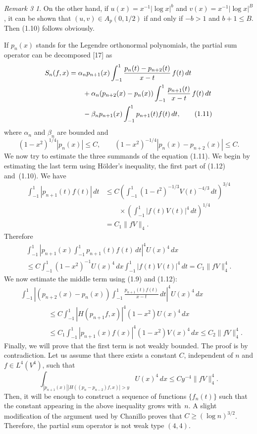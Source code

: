 \documentclass[10pt,a4paper]{article}
\theoremstyle{plain}
\theoremstyle{remark}
\newtheorem*{remThree}{Remark 3}
\begin{document}
\begin{remThree}
On the other hand, if $u(x) = x^{-1} |\log x|^{b}$
and $v(x) = x^{-1}|\log x|^{B}$, it can be shown
that $(u,v) \in A_{p}(0,1/2)$ if and only if $-b > 1$ and
$b+1 \leq B$. Then (1.10) follows obviously.

If $p_{n}(x)$ stands for the Legendre orthonormal polynomials, the
partial sum operator can be decomposed [17] as
\begin{align}
S_{n}(f,x) &= \alpha_{n}p_{n+1}(x)
\int_{-1}^{1} \frac{p_{n}(t)-p_{n+2}(t)}{x-t}\, f(t)\,dt \notag \\
&\qquad\null + \alpha_{n}(p_{n+2}(x)-p_{n}(x))
\int_{-1}^{1} \frac{p_{n+1}(t)}{x-t}\, f(t)\,dt \notag \\
&\qquad\null - \beta_{n}p_{n+1}(x) \int_{-1}^{1} p_{n+1}(t)f(t)\,dt,
\tag{1.11}
\end{align}
where $\alpha_{n}$ and $\beta_{n}$ are bounded and
\begin{equation}
(1-x^{2})^{1/4} |p_{n}(x)| \leq C,
\qquad (1-x^{2})^{-1/4} |p_{n}(x)-p_{n+2}(x)| \leq C.
\tag{1.12}
\end{equation}
We now try to estimate the three summands of the equation (1.11).
We begin by estimating the last term using H\"{o}lder's inequality,
the first part of (1.12) and~(1.10). We have
\begin{align*}
\int_{-1}^{1} |p_{n+1}(t)f(t)|\,dt
&\leq C \left( \int_{-1}^{1} (1-t^{2})^{-1/3} V(t)^{-4/3}\,dt \right)^{3/4} \\
&\qquad \times \left(\int_{-1}^{1} |f(t)V(t)|^{4}\,dt \right)^{1/4} \\
&= C_{1}\|fV\|_{4}.
\end{align*}
Therefore
\begin{multline*}
\int_{-1}^{1} \left| p_{n+1}(x)\int_{-1}^{1} p_{n+1}(t)f(t) \,dt
\right|^{4}U(x)^{4}\,dx \\
\leq C \int_{-1}^{1} (1-x^{2})^{-1}U(x)^{4}\,dx \int_{-1}^{1} |f(t)V(t)|^{4}\,dt
= C_{1}\|fV\|_{4}^{4}.
\end{multline*}
We now estimate the middle term using (1.9) and (1.12):
\begin{align*}
&\int_{-1}^{1} \left| (p_{n+2}(x)-p_{n}(x))
\int_{-1}^{1} \frac{p_{n+1}(t)f(t)}{x-t} \,dt \right|^{4}U(x)^{4}\,dx \\
&\qquad\qquad\leq C\int_{-1}^{1} |H(p_{n+1}f,x)|^{4}(1-x^{2})U(x)^{4}\,dx \\
&\qquad\qquad\leq C_{1}\int_{-1}^{1} |p_{n+1}(x)f(x)|^{4}(1-x^{2})V(x)^{4}\,dx
\leq C_{2}\|fV\|_{4}^{4}.
\end{align*}
Finally, we will prove that the first term is not weakly bounded.
The proof is by contradiction. Let us assume that there exists
a constant $C$, independent of $n$ and $f \in L^{4}(V^{4})$, such
that
$$
\int_{|p_{n+1}(x)| |H((p_{n}-p_{n-2})f,x)| > y} U(x)^{4}\,dx
\leq Cy^{-4} \|fV\|_{4}^{4}.
$$
Then, it will be enough to construct a sequence of functions
$\{f_{n}(t)\}$ such that the constant appearing in the above inequality
grows with~$n$. A slight modification of the argument used by Chanillo
proves that $C \geq (\log n)^{3/2}$.
Therefore, the partial sum operator is not weak type $(4,4)$.
\end{remThree}
\end{document}
